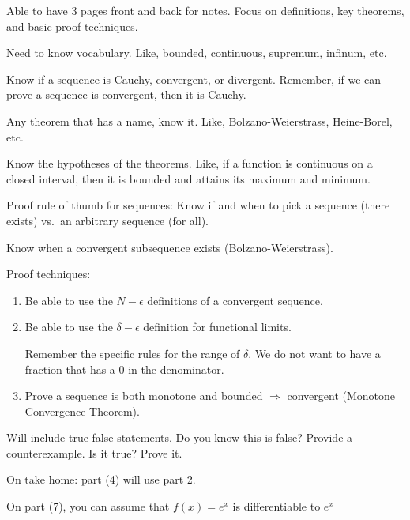 Able to have 3 pages front and back for notes. Focus on definitions, key theorems, and basic proof techniques.

Need to know vocabulary. Like, bounded, continuous, supremum, infinum, etc.

Know if a sequence is Cauchy, convergent, or divergent. Remember, if we can prove a sequence is convergent, then it is Cauchy.

Any theorem that has a name, know it. Like, Bolzano-Weierstrass, Heine-Borel, etc.

Know the hypotheses of the theorems. Like, if a function is continuous on a closed interval, then it is bounded and attains its maximum and minimum.

Proof rule of thumb for sequences: Know if and when to pick a sequence (there exists) vs.~an arbitrary sequence (for all).

Know when a convergent subsequence exists (Bolzano-Weierstrass).

Proof techniques:
\begin{enumerate}
    \item Be able to use the \(N-\epsilon\) definitions of a convergent sequence. 
    \item Be able to use the \(\delta-\epsilon\) definition for functional limits.

    Remember the specific rules for the range of \(\delta\). We do not want to have a fraction that has a 0 in the denominator.
    \item Prove a sequence is both monotone and bounded \(\Rightarrow\) convergent (Monotone Convergence Theorem).
\end{enumerate}
Will include true-false statements. Do you know this is false? Provide a counterexample. Is it true? Prove it.

On take home: part (4) will use part 2.

On part (7), you can assume that \(f(x) = e^{x}\) is differentiable to \(e^{x}\)